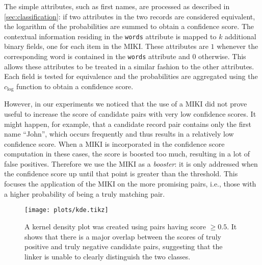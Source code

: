 The simple attributes, such as first names, are processed as described in \cref{sec:classification}: if two attributes in the two records are considered equivalent, the logarithm of the probabilities are summed to obtain a confidence score.
The contextual information residing in the \texttt{words} attribute is mapped to $k$ additional binary fields, one for each item in the MIKI.
These attributes are $1$ whenever the corresponding word is contained in the \texttt{words} attribute and $0$ otherwise.
This allows these attributes to be treated in a similar fashion to the other attributes.
Each field is tested for equivalence and the probabilities are aggregated using the $c_{\mathrm{log}}$ function to obtain a confidence score.

However, in our experiments we noticed that the use of a MIKI did not prove useful to increase the score of candidate pairs with very low confidence scores.
It might happen, for example, that a candidate record pair contains only the first name ``John'', which occurs frequently and thus results in a relatively low confidence score.
When a MIKI is incorporated in the confidence score computation in these cases, the score is boosted too much, resulting in a lot of false positives.
Therefore we use the MIKI as a \emph{booster}: it is only addressed when the confidence score up until that point is greater than the threshold.
This focuses the application of the MIKI on the more promising pairs, i.e., those with a higher probability of being a truly matching pair.

\begin{figure}
    \centering
    \texttt{[image: plots/kde.tikz]}
    \caption{A kernel density plot was created using pairs having score $\geq 0.5$. It shows that there is a major overlap between the scores of truly positive and truly negative candidate pairs, suggesting that the linker is unable to clearly distinguish the two classes.}
    \label{fig:kde}
\end{figure}

